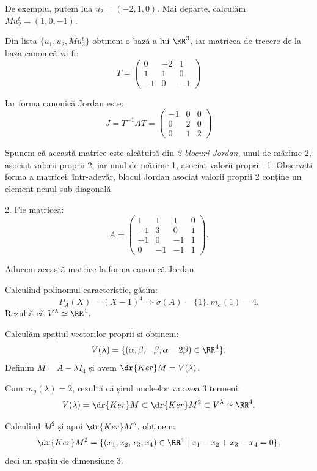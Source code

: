 De exemplu, putem lua $ u_2 = (-2, 1, 0) $. Mai departe, calculăm $ Mu_2^t = (1, 0, -1) $.

Din lista $ \{ u_1, u_2, Mu_2^t \} $ obținem o bază a lui $ \RR^3 $, iar matricea
de trecere de la baza canonică va fi:
\[
  T = \begin{pmatrix}
    0 & -2 & 1 \\
    1 & 1 & 0 \\
    -1 & 0 & -1
  \end{pmatrix}
\]

Iar forma canonică Jordan este:
\[
  J = T^{-1}AT = \begin{pmatrix}
    -1 & 0 & 0 \\
    0 & 2 & 0 \\
    0 & 1 & 2
  \end{pmatrix}
\]

Spunem că această matrice este alcătuită din \emph{2 blocuri Jordan},
unul de mărime 2, asociat valorii proprii 2, iar unul de mărime 1,
asociat valorii proprii -1. Observați forma  a matricei:
într-adevăr, blocul Jordan asociat valorii proprii 2 conține un element
nenul sub diagonală.

\vspace{1cm}

2. Fie matricea:
\[
  A = \begin{pmatrix}
    1 & 1 & 1 & 0 \\
    -1 & 3 & 0 & 1 \\
    -1 & 0 & -1 & 1 \\
    0 & -1 & -1 & 1
  \end{pmatrix}.
\]

Aducem această matrice la forma canonică Jordan.

Calculînd polinomul caracteristic, găsim:
\[
  P_A(X) = (X - 1)^4 \Rightarrow \sigma(A) = \{ 1 \}, m_a(1) = 4.
\]
Rezultă că $ V^\lambda \simeq \RR^4 $.

Calculăm spațiul vectorilor proprii și obținem:
\[
  V(\lambda) = \{ (\alpha, \beta, -\beta, \alpha - 2 \beta) \in \RR^4 \}.
\]
Definim $ M = A - \lambda I_4 $ și avem $ \dr{Ker}M = V(\lambda) $.

Cum $ m_g(\lambda) = 2 $, rezultă că șirul nucleelor va avea 3 termeni:
\[
  V(\lambda) = \dr{Ker} M \subset \dr{Ker}M^2 \subset V^\lambda \simeq \RR^4.
\]

Calculînd $ M^2 $ și apoi $ \dr{Ker}M^2 $, obținem:
\[
  \dr{Ker}M^2 = \{ (x_1, x_2, x_3, x_4) \in \RR^4 \mid x_1 - x_2 + x_3 - x_4 = 0 \},
\]
deci un spațiu de dimensiune 3.

